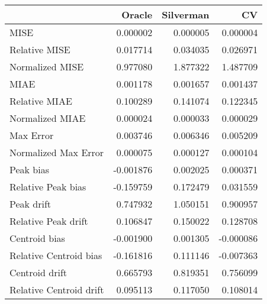 \begin{tabular}{lrrr}
  \hline
 & Oracle & Silverman & CV \\ 
  \hline
MISE & 0.000002 & 0.000005 & 0.000004 \\ 
  Relative MISE & 0.017714 & 0.034035 & 0.026971 \\ 
  Normalized MISE & 0.977080 & 1.877322 & 1.487709 \\ 
  MIAE & 0.001178 & 0.001657 & 0.001437 \\ 
  Relative MIAE & 0.100289 & 0.141074 & 0.122345 \\ 
  Normalized MIAE & 0.000024 & 0.000033 & 0.000029 \\ 
  Max Error & 0.003746 & 0.006346 & 0.005209 \\ 
  Normalized Max Error & 0.000075 & 0.000127 & 0.000104 \\ 
  Peak bias & -0.001876 & 0.002025 & 0.000371 \\ 
  Relative Peak bias & -0.159759 & 0.172479 & 0.031559 \\ 
  Peak drift & 0.747932 & 1.050151 & 0.900957 \\ 
  Relative Peak drift & 0.106847 & 0.150022 & 0.128708 \\ 
  Centroid bias & -0.001900 & 0.001305 & -0.000086 \\ 
  Relative Centroid bias & -0.161816 & 0.111146 & -0.007363 \\ 
  Centroid drift & 0.665793 & 0.819351 & 0.756099 \\ 
  Relative Centroid drift & 0.095113 & 0.117050 & 0.108014 \\ 
   \hline
\end{tabular}
